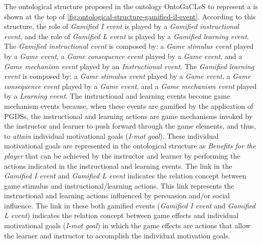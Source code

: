 The ontological structure proposed in the ontology OntoGaCLeS to represent a  is shown at the top of \autoref{fig:ontological-structure-gamified-il-event}. According to this structure, the role of \emph{Gamified I event} is played by a \emph{Gamified instructional event}, and the role of \emph{Gamified L event} is played by a \emph{Gamified learning event}. The \emph{Gamified instructional event} is composed by: a \emph{Game stimulus event} played by a \emph{Game event}, a \emph{Game consequence event} played by a \emph{Game event}, and a \emph{Game mechanism event} played by an \emph{Instructional event}. The \emph{Gamified learning event} is composed by: a \emph{Game stimulus event} played by a \emph{Game event}, a \emph{Game consequence event} played by a \emph{Game event}, and a \emph{Game mechanism event} played by a \emph{Learning event}. The instructional and learning events become game mechanism events because, when these events are gamified by the application of PGDSs, the instructional and learning actions are game mechanisms invoked by the instructor and learner to push forward through the game elements, and thus, to \emph{attain} individual motivational goals (\emph{I-mot goal}). These individual motivational goals are represented in the ontological structure as \emph{Benefits for the player} that can be achieved by the instructor and learner by performing the actions indicated in the instructional and learning events. The link  in the \emph{Gamified I event} and \emph{Gamified L event} indicates the relation concept between game stimulus and instructional/learning actions. This link represents the instructional and learning actions influenced by persuasion and/or social influence. The link  in these both gamified events (\emph{Gamified I event} and \emph{Gamified L event}) indicates the relation concept between game effects and individual motivational goals (\emph{I-mot goal}) in which the game effects are actions that allow the learner and instructor to accomplish the individual motivation goals.

